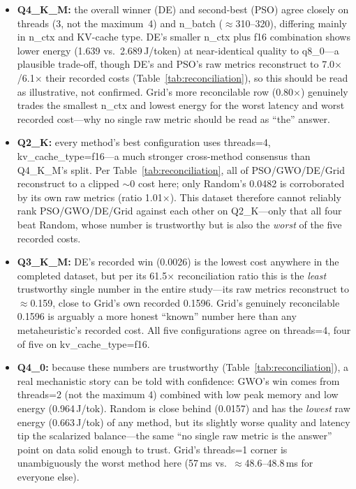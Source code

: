 \documentclass[journal]{IEEEtran}
\begin{document}
\begin{itemize}
  \item \textbf{Q4\_K\_M:} the overall winner (DE) and second-best (PSO) agree closely on threads (3, not the maximum~4) and n\_batch ($\approx$310--320), differing mainly in n\_ctx and KV-cache type. DE's smaller n\_ctx plus f16 combination shows lower energy (1.639 vs.\ 2.689\,J/token) at near-identical quality to q8\_0---a plausible trade-off, though DE's and PSO's raw metrics reconstruct to 7.0$\times$/6.1$\times$ their recorded costs (Table~\ref{tab:reconciliation}), so this should be read as illustrative, not confirmed. Grid's more reconcilable row (0.80$\times$) genuinely trades the smallest n\_ctx and lowest energy for the worst latency and worst recorded cost---why no single raw metric should be read as ``the'' answer.
  \item \textbf{Q2\_K:} every method's best configuration uses threads=4, kv\_cache\_type=f16---a much stronger cross-method consensus than Q4\_K\_M's split. Per Table~\ref{tab:reconciliation}, all of PSO/GWO/DE/Grid reconstruct to a clipped $\sim$0 cost here; only Random's 0.0482 is corroborated by its own raw metrics (ratio 1.01$\times$). This dataset therefore cannot reliably rank PSO/GWO/DE/Grid against each other on Q2\_K---only that all four beat Random, whose number is trustworthy but is also the \emph{worst} of the five recorded costs.
  \item \textbf{Q3\_K\_M:} DE's recorded win (0.0026) is the lowest cost anywhere in the completed dataset, but per its 61.5$\times$ reconciliation ratio this is the \emph{least} trustworthy single number in the entire study---its raw metrics reconstruct to $\approx$0.159, close to Grid's own recorded 0.1596. Grid's genuinely reconcilable 0.1596 is arguably a more honest ``known'' number here than any metaheuristic's recorded cost. All five configurations agree on threads=4, four of five on kv\_cache\_type=f16.
  \item \textbf{Q4\_0:} because these numbers are trustworthy (Table~\ref{tab:reconciliation}), a real mechanistic story can be told with confidence: GWO's win comes from threads=2 (not the maximum 4) combined with low peak memory and low energy (0.964\,J/tok). Random is close behind (0.0157) and has the \emph{lowest} raw energy (0.663\,J/tok) of any method, but its slightly worse quality and latency tip the scalarized balance---the same ``no single raw metric is the answer'' point on data solid enough to trust. Grid's threads=1 corner is unambiguously the worst method here (57\,ms vs.\ $\approx$48.6--48.8\,ms for everyone else).

\end{itemize}
\end{document}
